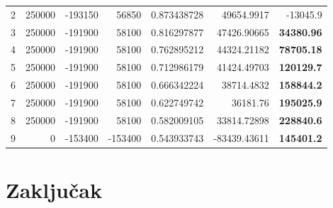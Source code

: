 \documentclass[12pt]{article}
\begin{document}
\begin{landscape}
\begin{table}[htbp]
\begin{tabular}{rrrrrrr}
    2     & 250000 & -193150 & 56850 & 0.873438728 & 49654.9917 & -13045.9 \\
    3     & 250000 & -191900 & 58100 & 0.816297877 & 47426.90665 & \textbf{34380.96} \\
    4     & 250000 & -191900 & 58100 & 0.762895212 & 44324.21182 & \textbf{78705.18} \\
    5     & 250000 & -191900 & 58100 & 0.712986179 & 41424.49703 & \textbf{120129.7} \\
    6     & 250000 & -191900 & 58100 & 0.666342224 & 38714.4832 & \textbf{158844.2} \\
    7     & 250000 & -191900 & 58100 & 0.622749742 & 36181.76 & \textbf{195025.9} \\
    8     & 250000 & -191900 & 58100 & 0.582009105 & 33814.72898 & \textbf{228840.6} \\
    \midrule
    9     & 0     & -153400 & -153400 & 0.543933743 & -83439.43611 & \textbf{145401.2} \\
    \bottomrule
    \end{tabular}%
  \label{profit3}%
\end{table}%

\end{landscape}

\section{Zaključak}



\end{document}
